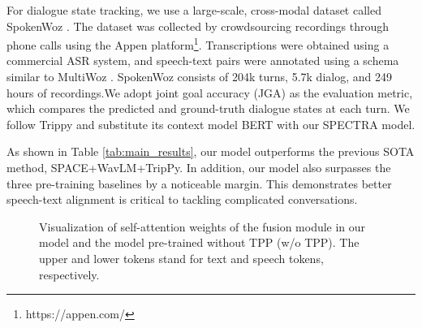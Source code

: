 \documentclass[11pt]{article}
\begin{document}
For dialogue state tracking, we use a large-scale, cross-modal dataset called SpokenWoz \citep{si2023spokenwoz}. The dataset was collected by crowdsourcing recordings through phone calls using the Appen platform\footnote{https://appen.com/}. Transcriptions were obtained using a commercial ASR system, and speech-text pairs were annotated using a schema similar to MultiWoz \citep{multiwoz}.  SpokenWoz consists of 204k turns, 5.7k dialog, and 249 hours of recordings.We adopt joint goal accuracy (JGA) as the evaluation metric, which compares the predicted and ground-truth dialogue states at each turn. 
We follow Trippy \citep{trippy} and substitute its context model BERT with our SPECTRA model. 


As shown in Table \ref{tab:main_results}, our model outperforms the previous SOTA method, SPACE+WavLM+TripPy. 
In addition, our model also surpasses the three pre-training baselines by a noticeable margin. 
This demonstrates better speech-text alignment is critical to tackling complicated conversations.

\begin{figure*}[t]
    \centering

    \caption{Visualization of self-attention weights of the fusion module in our model and the model pre-trained without TPP (w/o TPP). The upper and lower tokens stand for text and speech tokens, respectively.}
    \label{fig:case}
\end{figure*}


\begin{table*}[t]
\caption{Intent prediction results on test samples from the MIntRec dataset.}
\label{tab:case}
\end{table*}
\end{document}
